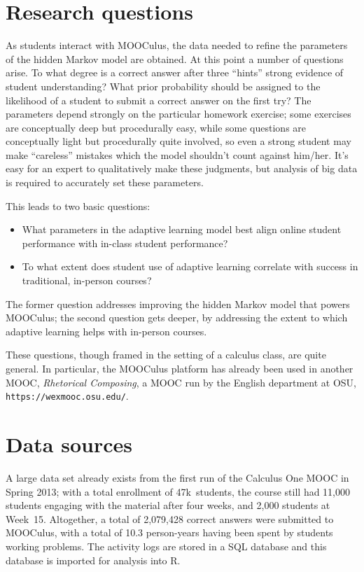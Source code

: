 \documentclass[12pt]{article}
\begin{document}
\section{Research questions}

As students interact with MOOCulus, the data needed to refine the
parameters of the hidden Markov model are obtained.  At this point a
number of questions arise. To what degree is a correct answer after
three ``hints'' strong evidence of student understanding?  What prior
probability should be assigned to the likelihood of a student to
submit a correct answer on the first try?  The parameters depend
strongly on the particular homework exercise; some exercises are
conceptually deep but procedurally easy, while some questions are
conceptually light but procedurally quite involved, so even a strong
student may make ``careless'' mistakes which the model shouldn't count
against him/her.  It's easy for an expert to qualitatively make these
judgments, but analysis of big data is required to accurately set
these parameters.

This leads to two basic questions:
\begin{itemize}
\item What parameters in the adaptive learning model best align online
  student performance with in-class student performance?
\item To what extent does student use of adaptive learning correlate
  with success in traditional, in-person courses?
\end{itemize}
The former question addresses improving the hidden Markov model that
powers MOOCulus; the second question gets deeper, by addressing the
extent to which adaptive learning helps with in-person courses.

These questions, though framed in the setting of a calculus class, are
quite general. In particular, the MOOCulus platform has already been
used in another MOOC, \textit{Rhetorical Composing}, a MOOC run by the
English department at OSU, \texttt{https://wexmooc.osu.edu/}.

\section{Data sources}

A large data set already exists from the first run of the Calculus One
MOOC in Spring 2013; with a total enrollment of 47k~students, the
course still had 11,000 students engaging with the material after four
weeks, and 2,000 students at Week~15.  Altogether, a total of
2,079,428 correct answers were submitted to MOOCulus, with a total of
10.3 person-years having been spent by students working problems.  The
activity logs are stored in a SQL database and this database is
imported for analysis into R.
\end{document}

